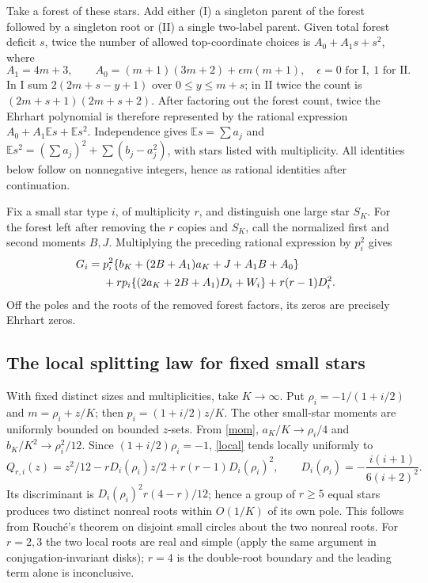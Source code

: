\documentclass[11pt]{article}
\newcommand{\E}{\mathbb E}
\begin{document}
Take a forest of these stars. Add either (I) a singleton parent of the
forest followed by a singleton root or (II) a single two-label parent.
Given total forest deficit $s$, twice the number of allowed top-coordinate
choices is $A_0+A_1s+s^2$, where
\[
 A_1=4m+3,\qquad A_0=(m+1)(3m+2)+\epsilon m(m+1),
 \quad \epsilon=0\text{ for I},\ 1\text{ for II}.
\]
In I sum $2(2m+s-y+1)$ over $0\le y\le m+s$; in II twice the count is
$(2m+s+1)(2m+s+2)$. After factoring out the forest count, twice the
Ehrhart polynomial is therefore represented by the rational expression
$A_0+A_1\E s+\E s^2$. Independence gives
$\E s=\sum a_j$ and $\E s^2=(\sum a_j)^2+\sum(b_j-a_j^2)$,
with stars listed with multiplicity. All identities below follow on
nonnegative integers, hence as rational identities after continuation.

Fix a small star type $i$, of multiplicity $r$, and distinguish one
large star $S_K$. For the forest left after removing the $r$ copies and
$S_K$, call the normalized first and second moments $B,J$. Multiplying
the preceding rational expression by $p_i^2$ gives
\begin{align}
 G_i={}&p_i^2\{b_K+(2B+A_1)a_K+J+A_1B+A_0\}\notag\\
 &+r p_i\{(2a_K+2B+A_1)D_i+W_i\}
       +r(r-1)D_i^2.\label{local}
\end{align}
Off the poles and the roots of the removed forest factors, its zeros
are precisely Ehrhart zeros.

\subsection*{The local splitting law for fixed small stars}
With fixed distinct sizes and multiplicities, take $K\to\infty$.
Put $\rho_i=-1/(1+i/2)$ and $m=\rho_i+z/K$; then
$p_i=(1+i/2)z/K$. The other small-star moments are uniformly bounded on
bounded $z$-sets. From \eqref{mom},
$a_K/K\to\rho_i/4$ and $b_K/K^2\to\rho_i^2/12$. Since
$(1+i/2)\rho_i=-1$, \eqref{local} tends locally uniformly to
\begin{equation}\label{quad}
 Q_{r,i}(z)=z^2/12-r D_i(\rho_i)z/2+r(r-1)D_i(\rho_i)^2,\qquad
 D_i(\rho_i)=-\frac{i(i+1)}{6(i+2)^2}.
\end{equation}
Its discriminant is $D_i(\rho_i)^2r(4-r)/12$; hence a group of $r\ge5$
equal stars produces two distinct nonreal roots within $O(1/K)$
of its own pole. This follows from Rouch\'e's theorem on disjoint small
circles about the two nonreal roots. For $r=2,3$ the two local roots are
real and simple (apply the same argument in conjugation-invariant disks);
$r=4$ is the double-root boundary and the leading term alone is inconclusive.
\end{document}
